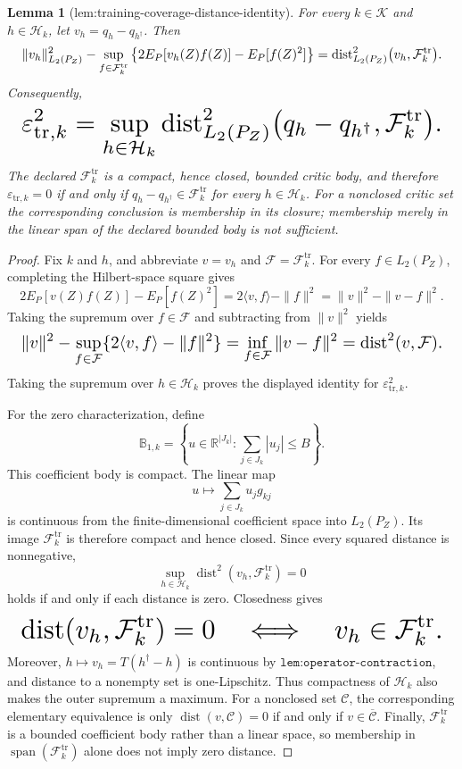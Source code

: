 \documentclass{article}
\newtheorem{lemma}{Lemma}
\begin{document}
\begin{lemma}[lem:training-coverage-distance-identity]\label{lem:training-coverage-distance-identity}
For every \(k\in\mathcal K\) and \(h\in\mathcal H_k\), let \(v_h=q_h-q_{h^\dagger}\). Then
\[
\makebox[\linewidth][c]{\resizebox{0.98\linewidth}{!}{\(\displaystyle \|v_h\|_{L_2(P_Z)}^2-\sup_{f\in\mathcal F_k^{\mathrm{tr}}}
 \left\{2E_P[v_h(Z)f(Z)]-E_P[f(Z)^2]\right\}
 =\operatorname{dist}_{L_2(P_Z)}^2
 \bigl(v_h,\mathcal F_k^{\mathrm{tr}}\bigr).\)}}
\]
Consequently,
\[
\makebox[\linewidth][c]{\resizebox{0.98\linewidth}{!}{\(\displaystyle \varepsilon_{\mathrm{tr},k}^2
 =\sup_{h\in\mathcal H_k}
 \operatorname{dist}_{L_2(P_Z)}^2
 \bigl(q_h-q_{h^\dagger},\mathcal F_k^{\mathrm{tr}}\bigr).\)}}
\]
The declared \(\mathcal F_k^{\mathrm{tr}}\) is a compact, hence closed, bounded critic body, and therefore \(\varepsilon_{\mathrm{tr},k}=0\) if and only if \(q_h-q_{h^\dagger}\in\mathcal F_k^{\mathrm{tr}}\) for every \(h\in\mathcal H_k\). For a nonclosed critic set the corresponding conclusion is membership in its closure; membership merely in the linear span of the declared bounded body is not sufficient.
\end{lemma}
\begin{proof}
Fix \(k\) and \(h\), and abbreviate \(v=v_h\) and \(\mathcal F=\mathcal F_k^{\mathrm{tr}}\). For every \(f\in L_2(P_Z)\), completing the Hilbert-space square gives
\[
 2E_P[v(Z)f(Z)]-E_P[f(Z)^2]
 =2\langle v,f\rangle-\|f\|^2
 =\|v\|^2-\|v-f\|^2.
\]
Taking the supremum over \(f\in\mathcal F\) and subtracting from \(\|v\|^2\) yields
\[
\makebox[\linewidth][c]{\resizebox{0.98\linewidth}{!}{\(\displaystyle \|v\|^2-\sup_{f\in\mathcal F}\{2\langle v,f\rangle-\|f\|^2\}
 =\inf_{f\in\mathcal F}\|v-f\|^2
 =\operatorname{dist}^2(v,\mathcal F).\)}}
\]
Taking the supremum over \(h\in\mathcal H_k\) proves the displayed identity for \(\varepsilon_{\mathrm{tr},k}^2\).

For the zero characterization, define
\[
 \mathbb B_{1,k}=\left\{u\in\mathbb R^{|J_k|}:\sum_{j\in J_k}|u_j|\le B\right\}.
\]
This coefficient body is compact. The linear map
\[
 u\longmapsto\sum_{j\in J_k}u_jg_{kj}
\]
is continuous from the finite-dimensional coefficient space into \(L_2(P_Z)\). Its image \(\mathcal F_k^{\mathrm{tr}}\) is therefore compact and hence closed. Since every squared distance is nonnegative,
\[
 \sup_{h\in\mathcal H_k}\operatorname{dist}^2(v_h,\mathcal F_k^{\mathrm{tr}})=0
\]
holds if and only if each distance is zero. Closedness gives
\[
\makebox[\linewidth][c]{\resizebox{0.98\linewidth}{!}{\(\displaystyle \operatorname{dist}(v_h,\mathcal F_k^{\mathrm{tr}})=0
 \quad\Longleftrightarrow\quad
 v_h\in\mathcal F_k^{\mathrm{tr}}.\)}}
\]
Moreover, \(h\mapsto v_h=T(h^\dagger-h)\) is continuous by \(\texttt{lem:operator-contraction}\), and distance to a nonempty set is one-Lipschitz. Thus compactness of \(\mathcal H_k\) also makes the outer supremum a maximum. For a nonclosed set \(\mathcal C\), the corresponding elementary equivalence is only \(\operatorname{dist}(v,\mathcal C)=0\) if and only if \(v\in\overline{\mathcal C}\). Finally, \(\mathcal F_k^{\mathrm{tr}}\) is a bounded coefficient body rather than a linear space, so membership in \(\operatorname{span}(\mathcal F_k^{\mathrm{tr}})\) alone does not imply zero distance.
\end{proof}
\end{document}
